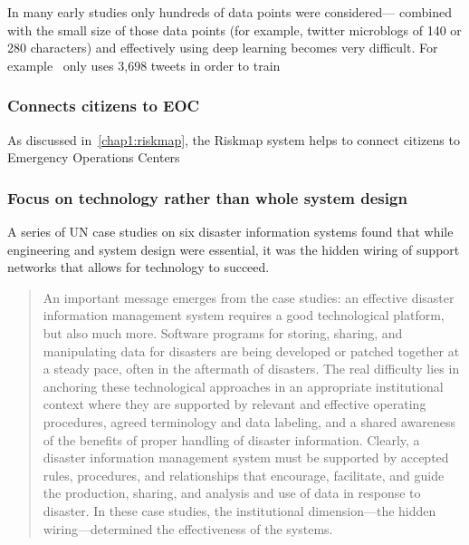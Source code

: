 In many early studies only hundreds of data points were considered--- combined
with the small size of those data points (for example, twitter microblogs of
140 or 280 characters) and effectively using deep learning becomes very
difficult.
For example~\cite{nagyCrowdSentimentDetection2012} only uses 3,698 tweets in
order to train 

\subsubsection{Connects citizens to EOC}
As discussed in~\ref{chap1:riskmap}, the Riskmap system helps to connect
citizens to Emergency Operations Centers

\subsubsection{Focus on technology rather than whole system design}
A series of UN case studies on six disaster information systems found that while
engineering and system design were essential, it was the hidden wiring of support
networks that allows for technology to succeed.

\begin{quote}
An important message emerges from the case studies: an effective disaster
information management system requires a good technological platform,
but also much more. Software programs for storing, sharing, and manipulating
data for disasters are being developed or patched together at a steady pace,
often in the aftermath of disasters. The real difficulty lies in anchoring
these technological approaches in an appropriate institutional context where
they are supported by relevant and effective operating procedures, agreed
terminology and data labeling, and a shared awareness of the benefits of proper
handling of disaster information. Clearly, a disaster information management
system must be supported by accepted rules, procedures, and relationships
that encourage, facilitate, and guide the production, sharing, and analysis and
use of data in response to disaster. In these case studies, the institutional
dimension---the hidden wiring---determined the effectiveness of the
systems.~\cite{aminDataNaturalDisasters2008}
\end{quote}

